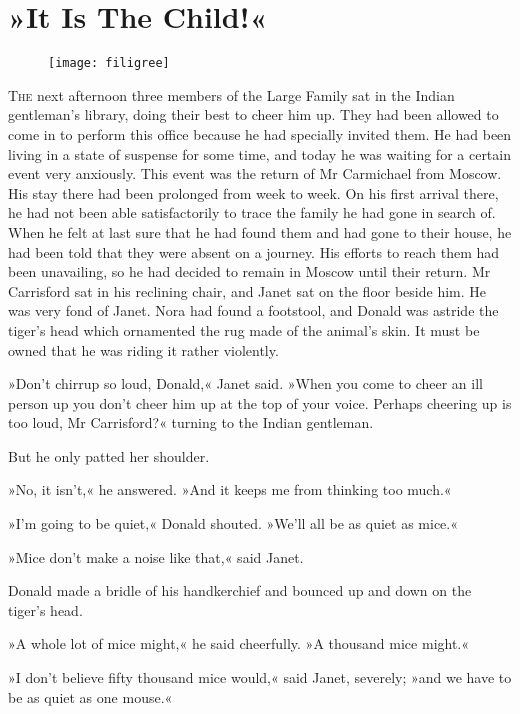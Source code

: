 \chapter{»It Is The Child!«}

\begin{figure}[t!]
\centering
\texttt{[image: filigree]}
\end{figure}

\lettrine[lines=5]{T}{he} next afternoon three members of the Large Family sat in the Indian gentleman's library, doing their best to cheer him up. They had been allowed to come in to perform this office because he had specially invited them. He had been living in a state of suspense for some time, and today he was waiting for a certain event very anxiously. This event was the return of Mr Carmichael from Moscow. His stay there had been prolonged from week to week. On his first arrival there, he had not been able satisfactorily to trace the family he had gone in search of. When he felt at last sure that he had found them and had gone to their house, he had been told that they were absent on a journey. His efforts to reach them had been unavailing, so he had decided to remain in Moscow until their return. Mr Carrisford sat in his reclining chair, and Janet sat on the floor beside him. He was very fond of Janet. Nora had found a footstool, and Donald was astride the tiger's head which ornamented the rug made of the animal's skin. It must be owned that he was riding it rather violently.

»Don't chirrup so loud, Donald,« Janet said. »When you come to cheer an ill person up you don't cheer him up at the top of your voice. Perhaps cheering up is too loud, Mr Carrisford?« turning to the Indian gentleman.

But he only patted her shoulder.

»No, it isn't,« he answered. »And it keeps me from thinking too much.«

»I'm going to be quiet,« Donald shouted. »We'll all be as quiet as mice.«

»Mice don't make a noise like that,« said Janet.

Donald made a bridle of his handkerchief and bounced up and down on the tiger's head.

»A whole lot of mice might,« he said cheerfully. »A thousand mice might.«

»I don't believe fifty thousand mice would,« said Janet, severely; »and we have to be as quiet as one mouse.«

